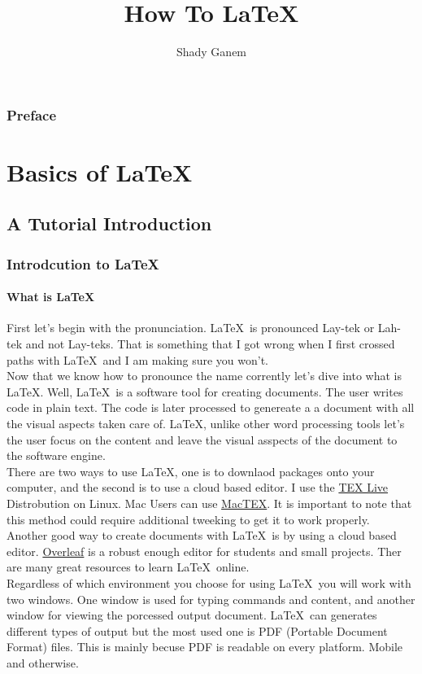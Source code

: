 \documentclass[12pt]{book}
\title{How To \LaTeX}
\author{Shady Ganem}
\begin{document}
\maketitle

\section*{Preface}

{
\hypersetup{linkcolor=black}
\tableofcontents
}
\newpage
{}%
\part{Basics of \LaTeX}

\chapter{A Tutorial Introduction}

\section{Introdcution to \LaTeX \ }

\subsection{What is \LaTeX \ }
First let's begin with the pronunciation. \LaTeX \ is pronounced Lay-tek or Lah-tek and not Lay-teks. 
That is something that I got wrong when I first crossed paths with \LaTeX \ and I am making sure you won't.\\
Now that we know how to pronounce the name corrently let's dive into what is \LaTeX. Well, \LaTeX \ is a software tool 
for creating documents. The user writes code in plain text. The code is later processed to genereate a 
a document with all the visual aspects taken care of. \LaTeX, unlike other word processing tools 
let's the user focus on the content and leave the visual asspects of the document to the software engine.\\
There are two ways to use \LaTeX, one is to downlaod packages onto your computer, and the second is to use a 
cloud based editor.
I use the \href{https://tug.org/texlive/}{TEX Live} Distrobution on Linux. Mac Users can use
\href{https://www.tug.org/mactex/}{MacTEX}. It is important to note that this method could 
require additional tweeking to get it to work properly.\\
Another good way to create documents with \LaTeX \ is by using a cloud based editor. 
\href{https://www.overleaf.com}{Overleaf} is a robust enough editor for students and small projects.
Ther are many great resources to learn \LaTeX \ online. \\
Regardless of which environment you choose for using \LaTeX \ you will work with two windows. 
One window is used for typing commands and content, and another window for viewing the porcessed output document.
\LaTeX \ can generates different types of output but the most used one is PDF (Portable Document Format) files. 
This is mainly becuse PDF is readable on every platform. Mobile and otherwise.\\
\end{document}

